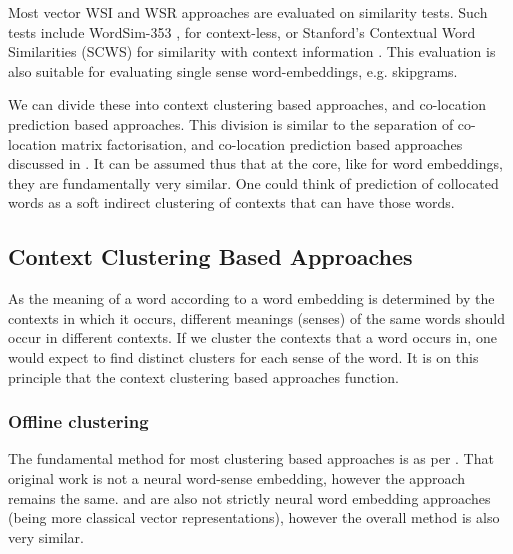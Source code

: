 \documentclass[12pt,parskip]{komatufte}
\begin{document}
Most vector WSI and WSR approaches are evaluated on similarity tests.
Such tests include WordSim-353 \parencite{WordSim353}, for context-less, or Stanford's Contextual Word Similarities (SCWS) for similarity with context information \parencite{Huang2012}.
This evaluation is also suitable for evaluating single sense word-embeddings, e.g. skipgrams.


We can divide these into context clustering based approaches,
and co-location prediction based approaches.
This division is similar to the separation of co-location matrix factorisation,
and co-location prediction based approaches discussed in .
It can be assumed thus that at the core, like for word embeddings,
they are fundamentally very similar.
One could think of prediction of collocated words as a soft indirect clustering of contexts that can have those words.


\subsection{Context Clustering Based Approaches}
As the meaning of a word according to a word embedding is determined by the contexts in which it occurs, different meanings (senses) of the same words should occur in different contexts.
If we cluster the contexts that a word occurs in, one would expect to find distinct clusters for each sense of the word.
It is on this principle that the context clustering based approaches function.



\subsubsection{Offline clustering}
The fundamental method for most clustering based approaches is as per .
That original work is not a neural word-sense embedding, however the approach remains the same.
 and  are also not strictly neural word embedding approaches (being more classical vector representations), however the overall method is also very similar.


\end{document}

